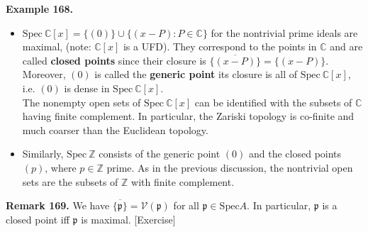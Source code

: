 \documentclass[12pt,a4paper,footinclude=true,headinclude=true]{scrbook} %
\newenvironment{remark}[2][Remark]
    { \begin{mdframed}[backgroundcolor=gray!20] \textbf{#1 #2.} }
    {  \end{mdframed}}
\newenvironment{example}[2][Example]
    { \begin{mdframed}[backgroundcolor=gray!20] \textbf{#1 #2.} }
    {  \end{mdframed}}
\begin{document}
\begin{example}{168}
    \begin{itemize}
        \item[(a)] $\mathrm{Spec}\ \mathbb{C}[x]=\{(0)\}\cup\{(x-P):P\in\mathbb{C}\}$ for the nontrivial prime ideals are maximal, (note: $\mathbb{C}[x]$ is a UFD). They correspond to the points in $\mathbb{C}$ and are called \textbf{closed points} since their closure is $\overline{\{(x-P)\}}=\{(x-P)\}$.\\
        Moreover, $(0)$ is called the \textbf{generic point} \textemdash its closure is all of $\mathrm{Spec}\ \mathbb{C}[x]$, i.e. $(0)$ is dense in $\mathrm{Spec}\ \mathbb{C}[x]$.\\
        The nonempty open sets of $\mathrm{Spec}\ \mathbb{C}[x]$ can be identified with the subsets of $\mathbb{C}$ having finite complement. In particular, the Zariski topology is co-finite and much coarser than the Euclidean topology.
        \item[(b)] Similarly, $\mathrm{Spec}\ \mathbb{Z}$ consists of the generic point $(0)$ and the closed points $(p)$, where $p\in\mathbb{Z}$ prime. As in the previous discussion, the nontrivial open sets are the subsets of $\mathbb{Z}$ with finite complement.
    \end{itemize}
\end{example}

\begin{remark}{169}
    We have $\overline{\{\mathfrak{p}\}}=\mathcal{V}(\mathfrak{p})$ for all $\mathfrak{p}\in\mathrm{Spec}A$. In particular, $\mathfrak{p}$ is a closed point iff $\mathfrak{p}$ is maximal. [Exercise]
\end{remark}
\end{document}
